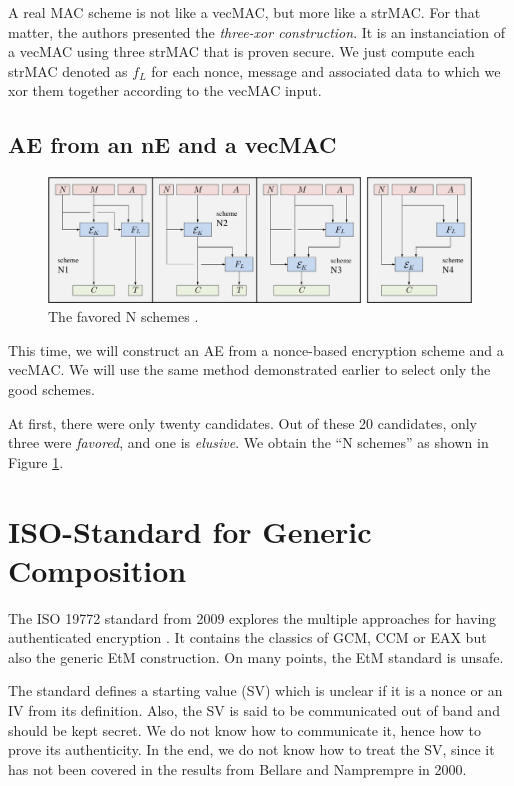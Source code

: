 \documentclass[10pt,a4paper]{article}
\begin{document}
A real MAC scheme is not like a vecMAC, but more like a strMAC.
For that matter, the authors presented the \emph{three-xor construction}.
It is an instanciation of a vecMAC using three strMAC that is proven secure.
We just compute each strMAC denoted as $f_L$ for each nonce, message and associated data to which we xor them together according to the vecMAC input.

\subsection{AE from an nE and a vecMAC}

\begin{figure}
	\centering \includegraphics[scale=0.25]{noncemac.jpg}
	\caption{The favored N schemes \cite{namprempre2014reconsidering}.\label{fig:nschemes}}
\end{figure}

This time, we will construct an AE from a nonce-based encryption scheme and a vecMAC.
We will use the same method demonstrated earlier to select only the good schemes.

At first, there were only twenty candidates.
Out of these 20 candidates, only three were \emph{favored}, and one is \emph{elusive}.
We obtain the ``N schemes'' as shown in Figure \ref{fig:nschemes}.

\section{ISO-Standard for Generic Composition}
The ISO 19772 standard from 2009 explores the multiple approaches for having authenticated encryption \cite{iso197722009}.
It contains the classics of GCM, CCM or EAX but also the generic EtM construction.
On many points, the EtM standard is unsafe.

The standard defines a starting value (SV) which is unclear if it is a nonce or an IV from its definition.
Also, the SV is said to be communicated out of band and should be kept secret.
We do not know how to communicate it, hence how to prove its authenticity.
In the end, we do not know how to treat the SV, since it has not been covered in the results from Bellare and Namprempre in 2000.
\end{document}
